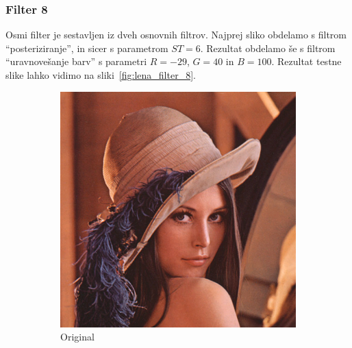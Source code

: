 \documentclass[a4paper, 12pt]{book}
\begin{document}
\subsubsection*{Filter 8}
Osmi filter je sestavljen iz dveh osnovnih filtrov. Najprej sliko obdelamo s
filtrom ``posteriziranje'', in sicer s parametrom $ST = 6$. Rezultat obdelamo
še s filtrom ``uravnovešanje barv'' s parametri $R = -29$, $G = 40$ in $B = 100$.
Rezultat testne slike lahko vidimo na sliki~\ref{fig:lena_filter_8}.

\begin{figure}[!ht]
    \centering
    \begin{subfigure}[b]{0.4\textwidth}
        \includegraphics[width=\textwidth]{lena}
        \caption{Original}
    \end{subfigure}
    \begin{subfigure}[b]{0.4\textwidth}

\end{subfigure}
\end{figure}
\end{document}
